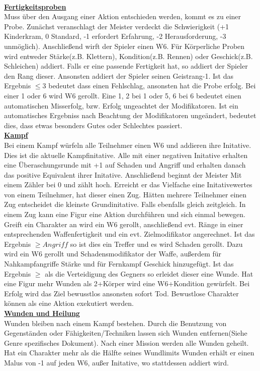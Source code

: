 \documentclass[twoside,a4paper]{minimal}
\begin{document}
\begin{multicols*}{3}
\textbf{\uline{\\Fertigkeitsproben}}
\\Muss über den Ausgang einer Aktion entschieden werden, kommt es zu einer Probe. Zunächst veranschlagt der Meister verdeckt die Schwierigkeit (+1 Kinderkram, 0 Standard, -1 erfordert Erfahrung, -2 Herausforderung, -3 unmöglich). Anschließend wirft der Spieler einen W6. Für Körperliche Proben wird entweder Stärke(z.B. Klettern), Kondition(z.B. Rennen) oder Geschick(z.B. Schleichen) addiert. Falls er eine passende Fertigkeit hat, so addiert der Spieler den Rang dieser. Ansonsten addiert der Spieler seinen Geistrang-1. Ist das Ergebnis $\leq 3$ bedeutet dass einen Fehlschlag, ansonsten hat die Probe erfolg. Bei einer 1 oder 6 wird W6 gerollt. Eine 1, 2 bei 1 oder 5, 6 bei 6 bedeutet einen automatischen Misserfolg, bzw. Erfolg ungeachtet der Modifikatoren. Ist ein automatisches Ergebniss nach Beachtung der Modifikatoren ungeändert, bedeutet dies, dass etwas besonders Gutes oder Schlechtes passiert.
\textbf{\uline{\\Kampf}}
\\Bei einem Kampf würfeln alle Teilnehmer einen W6 und addieren ihre Initative. Dies ist die aktuelle Kampfinitative. Alle mit einer negativen Initative erhalten eine Überaschungsrunde mit +1 auf Schaden und Angriff und erhalten danach das positive Equivalent ihrer Initative. Anschließend beginnt der Meister Mit einem Zähler bei 0 und zählt hoch. Erreicht er das Vielfache eine Initativewertes von einem Teilnehmer, hat dieser einen Zug. Hätten mehrere Teilnehmer einen Zug entscheidet die kleinste Grundinitative. Falls ebenfalls gleich zeitgleich.
In einem Zug kann eine Figur eine Aktion durchführen und sich einmal bewegen. Greift ein Charakter an wird ein W6 gerollt, anschließend evt. Ränge in einer entsprechenden Waffenfertigkeit und ein evt. Zielmodifikator angerechnet. Ist das Ergebnis $\geq Angriff$ so ist dies ein Treffer und es wird Schaden gerollt. Dazu wird ein W6 gerollt und Schadensmodifikator der Waffe, außerdem für Nahkampfangriffe Stärke und für Fernkampf Geschick hinzugefügt. Ist das Ergebnis $\geq$ als die Verteidigung des Gegners so erleidet dieser eine Wunde. Hat eine Figur mehr Wunden als 2+Körper wird eine W6+Kondition gewürfelt. Bei Erfolg wird das Ziel bewusstlos ansonsten sofort Tod. Bewustlose Charakter können als eine Aktion exekutiert werden.
\textbf{\uline{\\Wunden und Heilung}}
\\Wunden bleiben nach einem Kampf bestehen. Durch die Benutzung von Gegenständen oder Fähigkeiten/Techniken lassen sich Wunden entfernen(Siehe Genre spezifisches Dokument). Nach einer Mission werden alle Wunden geheilt. Hat ein Charakter mehr als die Hälfte seines Wundlimits Wunden erhält er einen Malus von -1 auf jeden W6, außer Initative, wo stattdessen addiert wird.

\end{multicols*}
\end{document}
